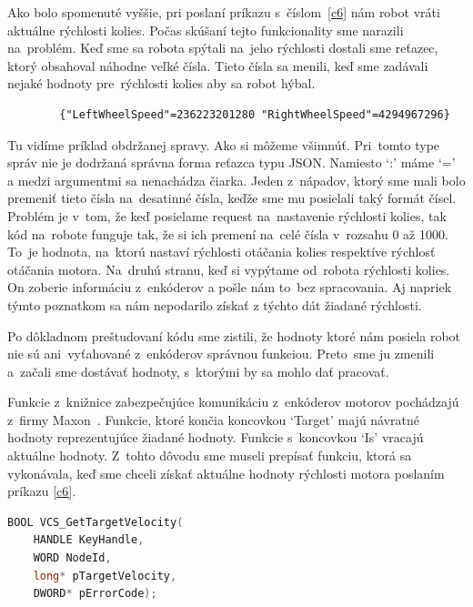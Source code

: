 Ako bolo spomenuté vyššie, pri poslaní príkazu s~číslom~\ref{c6} nám robot vráti aktuálne rýchlosti kolies. Počas skúšaní tejto funkcionality
sme narazili na~problém. Keď sme sa robota spýtali na~jeho rýchlosti dostali sme reťazec, ktorý obsahoval náhodne veľké čísla. Tieto čísla sa
menili, keď sme zadávali nejaké hodnoty pre~rýchlosti kolies aby sa robot hýbal.

\label{jsonWannabeSpeed}
\begin{lstlisting}
		{"LeftWheelSpeed"=236223201280 "RightWheelSpeed"=4294967296}
\end{lstlisting}

Tu vidíme príklad obdržanej spravy. Ako si môžeme všimnúť. Pri~tomto type správ nie je dodržaná správna forma reťazca typu JSON. Namiesto `:'
máme `=' a medzi argumentmi sa nenachádza čiarka. Jeden z~nápadov, ktorý sme mali bolo premeniť tieto čísla na~desatinné čísla, keďže sme mu
posielali taký formát čísel. Problém je v~tom, že keď posielame request na~nastavenie rýchlosti kolies, tak kód na~robote funguje tak, že si
ich premení na~celé čísla v~rozsahu 0 až 1000. To~je hodnota, na~ktorú nastaví rýchlosti otáčania kolies respektíve rýchlosť otáčania motora.
Na~druhú stranu, keď si vypýtame od~robota rýchlosti kolies. On zoberie informáciu z~enkóderov a pošle nám to~bez spracovania. Aj napriek týmto
poznatkom sa nám nepodarilo získať z týchto dát žiadané rýchlosti.

Po dôkladnom preštudovaní kódu sme zistili, že hodnoty ktoré nám posiela robot nie sú ani~vyťahované z~enkóderov správnou funkciou. Preto~sme ju
zmenili a~začali sme dostávať hodnoty, s~ktorými by sa mohlo dať pracovať.

Funkcie z~knižnice zabezpečujúce komunikáciu z~enkóderov motorov pochádzajú z~firmy Maxon~\cite{EPOSdoc}. Funkcie, ktoré končia koncovkou `Target'
majú návratné hodnoty reprezentujúce žiadané hodnoty. Funkcie s~koncovkou `Is' vracajú aktuálne hodnoty. Z~tohto dôvodu sme museli prepísať
funkciu, ktorá sa vykonávala, keď sme chceli získať aktuálne hodnoty rýchlosti motora poslaním príkazu \ref{c6}.


\label{VelocityIs}
\begin{lstlisting}[language=C++]
BOOL VCS_GetTargetVelocity(
	HANDLE KeyHandle,
	WORD NodeId,
	long* pTargetVelocity,
	DWORD* pErrorCode);
\end{lstlisting}

